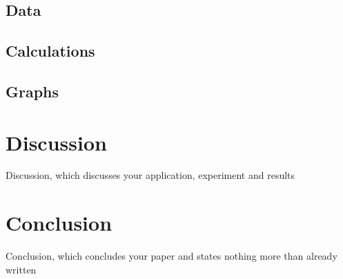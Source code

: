 \documentclass[12pt]{article}
\begin{document}
\subsection{Data}
\subsection{Calculations}

\subsection{Graphs}

\section{Discussion}
Discussion, which discusses your application, experiment and results

\section{Conclusion}
Conclusion, which concludes your paper and states nothing more than already
written

 
 
\end{document}
